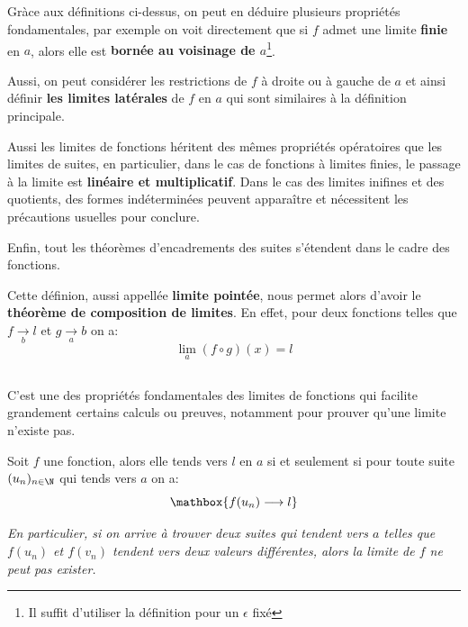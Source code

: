 \subsection*{}
Gràce aux définitions ci-dessus, on peut en déduire plusieurs propriétés fondamentales, par exemple on voit directement que si \(f\) admet une limite \textbf{finie} en \(a\), alors elle est \textbf{bornée au voisinage de \(a\)}\footnote[1]{Il suffit d'utiliser la définition pour un \(\epsilon\) fixé}. \<

Aussi, on peut considérer les restrictions de \(f\) à droite ou à gauche de \(a\) et ainsi définir \textbf{les limites latérales} de \(f\) en \(a\) qui sont similaires à la définition principale.\<

Aussi les limites de fonctions héritent des mêmes propriétés opératoires que les limites de suites, en particulier, dans le cas de fonctions à limites finies, le passage à la limite est \textbf{linéaire et multiplicatif}.\+
Dans le cas des limites inifines et des quotients, des formes indéterminées peuvent apparaître et nécessitent les précautions usuelles pour conclure.\<

Enfin, tout les théorèmes d'encadrements des suites s'étendent dans le cadre des fonctions.\<

Cette définion, aussi appellée \textbf{limite pointée}, nous permet alors d'avoir le \textbf{théorème de composition de limites}.\+
En effet, pour deux fonctions telles que \(f \underset{b}{\rightarrow}l\) et \(g \underset{a}{\rightarrow}b \) on a:
\[
   \lim_{a} (f \circ g)(x) = l
\]
\subsection*{}
C'est une des propriétés fondamentales des limites de fonctions qui facilite grandement certains calculs ou preuves, notamment pour prouver qu'une limite n'existe pas.\<

Soit \(f\) une fonction, alors elle tends vers \(l\) en \(a\) si et seulement si pour toute suite \((u_n)_{n \in \N}\) qui tends vers \(a\) on a:
\[
   \mathbox{f(u_n) \longrightarrow l}
\] 
\begin{center}
   \textit{
      En particulier, si on arrive à trouver deux suites qui tendent vers \(a\) telles que \(f(u_n)\) et \(f(v_n)\) tendent vers deux valeurs différentes, alors la limite de \(f\) ne peut pas exister.
   }
\end{center}

